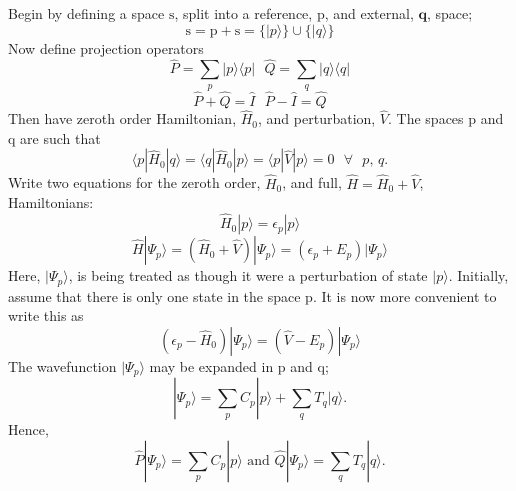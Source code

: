 Begin by defining a space $\mathrm{s}$, split into a reference, $\mathrm{p}$, and external, $\mathbf{q}$, space;
\begin{equation}
\mathrm{s} = \mathrm{p} + \mathrm{s} = \{ |p\rangle \} \cup \{|q\rangle \}
\end{equation}
Now define projection operators
\begin{equation}
\hat{P} =\sum_{p} |p\rangle \langle p | 
\text{ \ \ \ \ \ \ \ \ \ }
\hat{Q} =\sum_{q} |q\rangle \langle q | 
\end{equation}
\begin{equation}
\hat{P}+\hat{Q} = \hat{I}
\text{\ \ \ \ \ \ \ \ \ }
\hat{P}-\hat{I} = \hat{Q}
\end{equation}
Then have zeroth order Hamiltonian, $\hat{H}_{0}$, and perturbation, $\hat{V}$. The spaces $\mathrm{p}$ and $\mathrm{q}$ are such that
\begin{equation}
\langle p | \hat{H}_{0} | q \rangle  = 
\langle q | \hat{H}_{0} | p \rangle  = 
\langle p | \hat{V} | p \rangle  =  0 \text{ \ \ \ } \forall \text{ \ }p\text{,\ }q  . 
\label{eqn:space_props}
\end{equation}
Write two equations for the zeroth order, $\hat{H}_{0}$, and full, $\hat{H} = \hat{H}_{0} + \hat{V}$, Hamiltonians:
\begin{equation}
\hat{H}_{0} | p \rangle  = \epsilon_{p} |p \rangle
\end{equation}
\begin{equation}
\hat{H}|\Psi_{p} \rangle =( \hat{H}_{0}+\hat{V} )| \Psi_{p} \rangle  = (\epsilon_{p}+E_{p})|\Psi_{p} \rangle
\end{equation}
Here, $|\Psi_{p}\rangle$, is being treated as though it were a perturbation of state $|p\rangle$. Initially, 
assume that there is only one state in the space $\mathrm{p}$. It is now more convenient to write this as
\begin{equation}
(\epsilon_{p}-\hat{H}_{0} )| \Psi_{p} \rangle  = (\hat{V}-E_{p})|\Psi_{p} \rangle
\end{equation}
The wavefunction $|\Psi_{p} \rangle$ may be expanded in $\mathrm{p}$ and $\mathrm{q}$;
\begin{equation}
| \Psi_{p} \rangle  = \sum_{p} C_{p}|p\rangle + \sum_{q} T_{q}|q\rangle.
\end{equation}
Hence,
\begin{equation}
\hat{P} | \Psi_{p} \rangle  = \sum_{p} C_{p}|p\rangle
\text{ \ \ \ \  and \ \ \ \ }
\hat{Q} | \Psi_{p} \rangle  = \sum_{q} T_{q}|q\rangle .
\end{equation}
